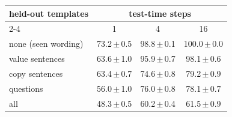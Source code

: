 \begin{tabular}{lccc}
\toprule
held-out templates & \multicolumn{3}{c}{test-time steps} \\
\cmidrule(lr){2-4}
 & 1 & 4 & 16 \\
\midrule
none (seen wording) & 73.2\,$\pm$\,0.5 & 98.8\,$\pm$\,0.1 & 100.0\,$\pm$\,0.0 \\
value sentences & 63.6\,$\pm$\,1.0 & 95.9\,$\pm$\,0.7 & 98.1\,$\pm$\,0.6 \\
copy sentences & 63.4\,$\pm$\,0.7 & 74.6\,$\pm$\,0.8 & 79.2\,$\pm$\,0.9 \\
questions & 56.0\,$\pm$\,1.0 & 76.0\,$\pm$\,0.8 & 78.1\,$\pm$\,0.7 \\
all & 48.3\,$\pm$\,0.5 & 60.2\,$\pm$\,0.4 & 61.5\,$\pm$\,0.9 \\
\bottomrule
\end{tabular}
